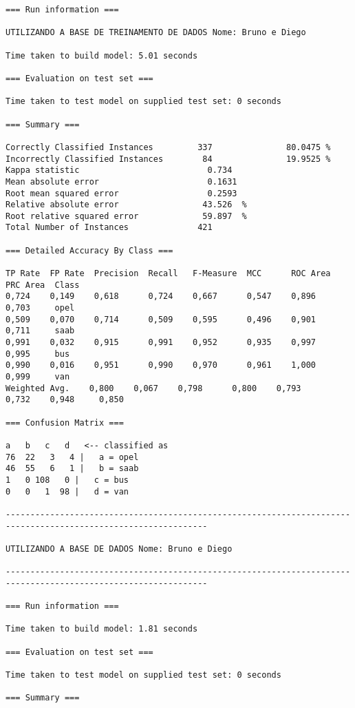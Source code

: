 \documentclass[
	article,			%
	11pt,				%
	oneside,			%
	a4paper,			%
	english,			%
	brazil,				%
	sumario=tradicional
	]{abntex2}
\begin{document}
\begin{lstlisting}
=== Run information ===

UTILIZANDO A BASE DE TREINAMENTO DE DADOS Nome: Bruno e Diego

Time taken to build model: 5.01 seconds

=== Evaluation on test set ===

Time taken to test model on supplied test set: 0 seconds

=== Summary ===

Correctly Classified Instances         337               80.0475 %
Incorrectly Classified Instances        84               19.9525 %
Kappa statistic                          0.734 
Mean absolute error                      0.1631
Root mean squared error                  0.2593
Relative absolute error                 43.526  %
Root relative squared error             59.897  %
Total Number of Instances              421     

=== Detailed Accuracy By Class ===

TP Rate  FP Rate  Precision  Recall   F-Measure  MCC      ROC Area  PRC Area  Class
0,724    0,149    0,618      0,724    0,667      0,547    0,896     0,703     opel
0,509    0,070    0,714      0,509    0,595      0,496    0,901     0,711     saab
0,991    0,032    0,915      0,991    0,952      0,935    0,997     0,995     bus
0,990    0,016    0,951      0,990    0,970      0,961    1,000     0,999     van
Weighted Avg.    0,800    0,067    0,798      0,800    0,793      0,732    0,948     0,850     

=== Confusion Matrix ===

a   b   c   d   <-- classified as
76  22   3   4 |   a = opel
46  55   6   1 |   b = saab
1   0 108   0 |   c = bus
0   0   1  98 |   d = van

---------------------------------------------------------------------------------------------------------------

UTILIZANDO A BASE DE DADOS Nome: Bruno e Diego

---------------------------------------------------------------------------------------------------------------

=== Run information ===

Time taken to build model: 1.81 seconds

=== Evaluation on test set ===

Time taken to test model on supplied test set: 0 seconds

=== Summary ===


\end{lstlisting}
\end{document}
